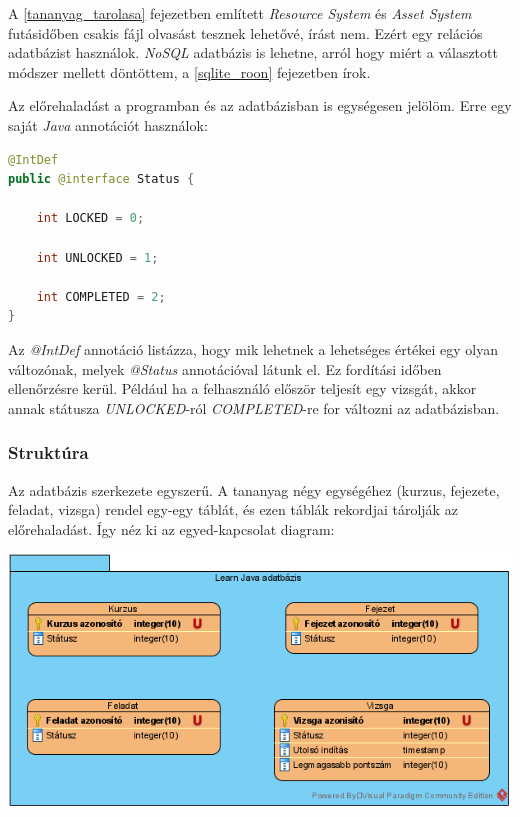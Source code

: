 \documentclass[12pt,a4paper]{article}
\begin{document}
	A \ref{tananyag_tarolasa} fejezetben említett \textit{Resource System} és \textit{Asset System} futásidőben csakis fájl olvasást tesznek lehetővé, írást nem. Ezért egy relációs adatbázist használok. \textit{NoSQL} adatbázis is lehetne, arról hogy miért a választott módszer mellett döntöttem, a \ref{sqlite_roon} fejezetben írok.
	
	Az előrehaladást a programban és az adatbázisban is egységesen jelölöm. Erre egy saját \textit{Java} annotációt használok:
	
	\begin{lstlisting}[language=Java]
@IntDef
public @interface Status {

	int LOCKED = 0;
		
	int UNLOCKED = 1;
		
	int COMPLETED = 2;
}
	\end{lstlisting}
	
	Az \textit{@IntDef} annotáció listázza, hogy mik lehetnek a lehetséges értékei egy olyan változónak, melyek \textit{@Status} annotációval látunk el. Ez fordítási időben ellenőrzésre kerül. Például ha a felhasználó először teljesít egy vizsgát, akkor annak státusza \textit{UNLOCKED}-ról \textit{COMPLETED}-re for változni az adatbázisban.
	 
	\subsubsection{Struktúra}\label{adatbazis_struktura}
	 
	Az adatbázis szerkezete egyszerű. A tananyag négy egységéhez (kurzus, fejezete, feladat, vizsga) rendel egy-egy táblát, és ezen táblák rekordjai tárolják az előrehaladást. Így néz ki az egyed-kapcsolat diagram:
	
	\begin{center}
		\includegraphics[width=\linewidth]{db_model}
	\end{center}
	
\end{document}
